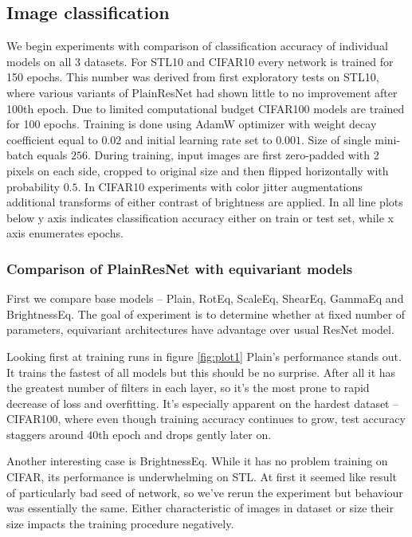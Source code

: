 \newpage










\subsection{Image classification}
    We begin experiments with comparison of classification accuracy of
    individual models on all 3 datasets. For STL10 and CIFAR10 every network
    is trained for 150 epochs. This number was derived from first exploratory
    tests on STL10, where various variants of PlainResNet had shown little to
    no improvement after 100th epoch. Due to limited computational budget
    CIFAR100 models are trained for 100 epochs. Training is done using AdamW
    optimizer \cite{adamw} with weight decay coefficient equal to $0.02$ and
    initial learning rate set to $0.001$. Size of single mini-batch equals
    $256$. During training, input images are first zero-padded with 2 pixels
    on each side, cropped to original size and then flipped horizontally with
    probability $0.5$. In CIFAR10 experiments with color jitter augmentations
    additional transforms of either contrast of brightness are applied.
    In all line plots below y axis indicates classification accuracy either on
    train or test set, while x axis enumerates epochs.

    \subsubsection*{Comparison of PlainResNet with equivariant models}
    First we compare base models -- Plain, RotEq, ScaleEq, ShearEq, GammaEq and
    BrightnessEq. The goal of experiment is to determine whether at fixed number
    of parameters, equivariant
    architectures have advantage over usual ResNet model.

    Looking first at
    training runs in figure \ref{fig:plot1} Plain's performance stands out.
    It trains the fastest of all models but this should be no surprise. After
    all it has the greatest number of filters in each layer, so it's the most
    prone to rapid decrease of loss and overfitting. It's especially apparent on
    the hardest dataset --
    CIFAR100, where even though training accuracy continues to grow, test
    accuracy staggers around $40$th epoch and drops gently later on.

    Another interesting case is BrightnessEq. While it has no problem training
    on CIFAR, its performance is underwhelming on STL. At first it seemed like
    result of particularly bad seed of network, so we've rerun the experiment
    but behaviour was essentially the same. Either characteristic of images in
    dataset or size their size impacts the training procedure negatively.

